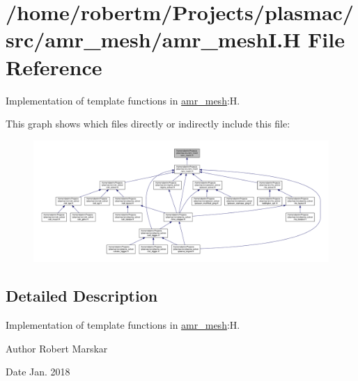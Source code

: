 \hypertarget{amr__meshI_8H}{}\section{/home/robertm/\+Projects/plasmac/src/amr\+\_\+mesh/amr\+\_\+meshI.H File Reference}
\label{amr__meshI_8H}


Implementation of template functions in \hyperlink{classamr__mesh}{amr\+\_\+mesh}\+:H.  


This graph shows which files directly or indirectly include this file\+:\nopagebreak
\begin{figure}[H]
\begin{center}
\leavevmode
\includegraphics[width=350pt]{amr__meshI_8H__dep__incl}
\end{center}
\end{figure}


\subsection{Detailed Description}
Implementation of template functions in \hyperlink{classamr__mesh}{amr\+\_\+mesh}\+:H. 

\begin{DoxyAuthor}{Author}
Robert Marskar 
\end{DoxyAuthor}
\begin{DoxyDate}{Date}
Jan. 2018 
\end{DoxyDate}
